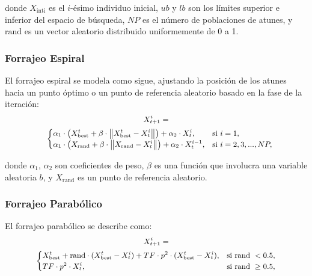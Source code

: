 \documentclass[conference]{IEEEtran}
\begin{document}
donde $X_{\text{inti}}$ es el $i$-ésimo individuo inicial, $ub$ y $lb$ son los límites superior e inferior del espacio de búsqueda, $NP$ es el número de poblaciones de atunes, y $\text{rand}$ es un vector aleatorio distribuido uniformemente de 0 a 1.

\subsubsection{Forrajeo Espiral}
El forrajeo espiral se modela como sigue, ajustando la posición de los atunes hacia un punto óptimo o un punto de referencia aleatorio basado en la fase de la iteración:
\begin{equation}
	\small
	\begin{gathered}
		X_{t+1}^i = \\
		\quad
		\begin{cases}
			\alpha_1 \cdot \left(X_{\text{best}}^t + \beta \cdot \left\lVert X_{\text{best}}^t - X_t^i \right\rVert \right) + \alpha_2 \cdot X_t^i, & \text{si } i = 1,\\
			\alpha_1 \cdot \left(X_{\text{rand}} + \beta \cdot \left\lVert X_{\text{rand}} - X_t^i \right\rVert \right) + \alpha_2 \cdot X_t^{i-1}, & \text{si } i = 2,3,...,NP,
		\end{cases}
	\end{gathered}
\end{equation}


donde $\alpha_1$, $\alpha_2$ son coeficientes de peso, $\beta$ es una función que involucra una variable aleatoria $b$, y $X_{\text{rand}}$ es un punto de referencia aleatorio.

\subsubsection{Forrajeo Parabólico}
El forrajeo parabólico se describe como:
\begin{equation}
	\small
	\begin{gathered}
		X_{t+1}^i = \\
		\begin{cases}
			X_{\text{best}}^t + \text{rand} \cdot (X_{\text{best}}^t - X_t^i) + TF \cdot p^2 \cdot (X_{\text{best}}^t - X_t^i), & \text{si rand } < 0.5,\\
			TF \cdot p^2 \cdot X_t^i, & \text{si rand } \geq 0.5,
		\end{cases}
	\end{gathered}
\end{equation}
\end{document}
